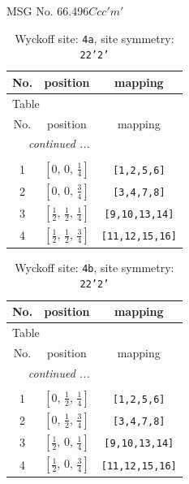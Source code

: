 \documentclass[fleqn,8pt]{jsarticle}
\begin{document}
\setcounter{MaxMatrixCols}{32}

\renewcommand{\tablename}{Table~}
\renewcommand{\figurename}{Figure~}
\begin{center}
\LARGE
MSG No. 66.496\quad$Ccc'm'$
\end{center}
\renewcommand{\arraystretch}{1.2}
\begin{longtable}{ccc}
\caption{Wyckoff site: {\tt 4a}, site symmetry: {\tt 22'2'}}
 \\
 \hline \hline
No. & position & mapping \\ \hline \endfirsthead

\multicolumn{2}{l}{\tablename\ \thetable{}} \\
 \hline \hline
No. & position & mapping \\ \hline \endhead

 \hline \hline
\multicolumn{2}{r}{\footnotesize\it continued ...} \\ \endfoot

 \hline \hline
\multicolumn{2}{r}{} \\ \endlastfoot

1 & $\left[ 0,\, 0,\, \frac{1}{4} \right]$ & {\tt [1,2,5,6]} \\ \hline
2 & $\left[ 0,\, 0,\, \frac{3}{4} \right]$ & {\tt [3,4,7,8]} \\ \hline
3 & $\left[ \frac{1}{2},\, \frac{1}{2},\, \frac{1}{4} \right]$ & {\tt [9,10,13,14]} \\ \hline
4 & $\left[ \frac{1}{2},\, \frac{1}{2},\, \frac{3}{4} \right]$ & {\tt [11,12,15,16]} \\
\end{longtable}
\renewcommand{\arraystretch}{1.2}
\begin{longtable}{ccc}
\caption{Wyckoff site: {\tt 4b}, site symmetry: {\tt 22'2'}}
 \\
 \hline \hline
No. & position & mapping \\ \hline \endfirsthead

\multicolumn{2}{l}{\tablename\ \thetable{}} \\
 \hline \hline
No. & position & mapping \\ \hline \endhead

 \hline \hline
\multicolumn{2}{r}{\footnotesize\it continued ...} \\ \endfoot

 \hline \hline
\multicolumn{2}{r}{} \\ \endlastfoot

1 & $\left[ 0,\, \frac{1}{2},\, \frac{1}{4} \right]$ & {\tt [1,2,5,6]} \\ \hline
2 & $\left[ 0,\, \frac{1}{2},\, \frac{3}{4} \right]$ & {\tt [3,4,7,8]} \\ \hline
3 & $\left[ \frac{1}{2},\, 0,\, \frac{1}{4} \right]$ & {\tt [9,10,13,14]} \\ \hline
4 & $\left[ \frac{1}{2},\, 0,\, \frac{3}{4} \right]$ & {\tt [11,12,15,16]} \\
\end{longtable}
\end{document}
